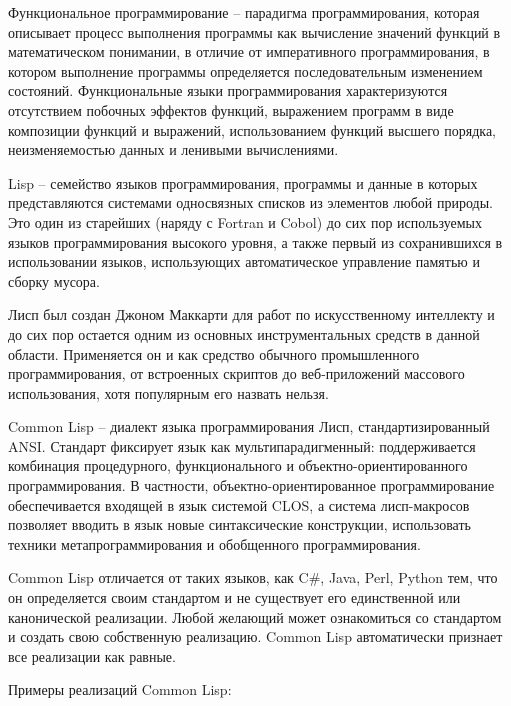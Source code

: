 Функциональное программирование -- парадигма программирования, которая описывает процесс выполнения программы как вычисление значений функций в математическом понимании, в отличие от императивного программирования, в котором выполнение программы определяется последовательным изменением состояний. Функциональные языки программирования характеризуются отсутствием побочных эффектов функций, выражением программ в виде композиции функций и выражений, использованием функций высшего порядка, неизменяемостью данных и ленивыми вычислениями.

Lisp -- семейство языков программирования, программы и данные в которых представляются системами односвязных списков из элементов любой природы. Это один из старейших (наряду с Fortran и Cobol) до сих пор используемых языков программирования высокого уровня, а также первый из сохранившихся в использовании языков, использующих автоматическое управление памятью и сборку мусора.

Лисп был создан Джоном Маккарти для работ по искусственному интеллекту и до сих пор остается одним из основных инструментальных средств в данной области. Применяется он и как средство обычного промышленного программирования, от встроенных скриптов до веб-приложений массового использования, хотя популярным его назвать нельзя.

Common Lisp -- диалект языка программирования Лисп, стандартизированный ANSI. Стандарт фиксирует язык как мультипарадигменный: поддерживается комбинация процедурного, функционального и объектно-ориентированного программирования. В частности, объектно-ориентированное программирование обеспечивается входящей в язык системой CLOS, а система лисп-макросов позволяет вводить в язык новые синтаксические конструкции, использовать техники метапрограммирования и обобщенного программирования.

Common Lisp отличается от таких языков, как C\#, Java, Perl, Python тем, что он определяется своим стандартом и не существует его единственной или канонической реализации. Любой желающий может ознакомиться со стандартом и создать свою собственную реализацию. Common Lisp автоматически признает все реализации как равные.

Примеры реализаций Common Lisp:

